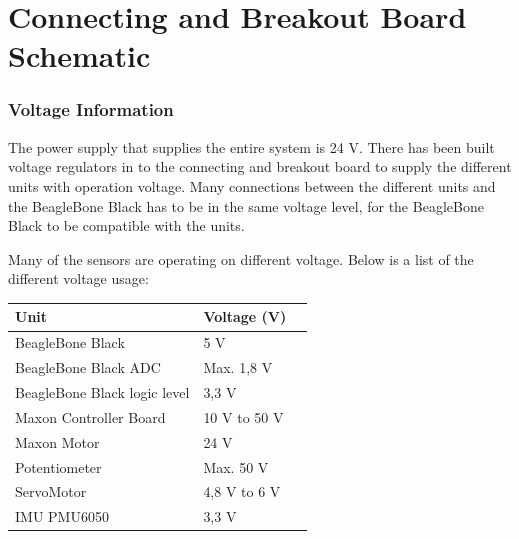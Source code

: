 \chapter{Connecting and Breakout Board Schematic}\label{app:ConnectingBreakoutBoard} 


\subsection{Voltage Information}
The power supply that supplies the entire system is 24 V. There has been built voltage regulators in to the connecting and breakout board to supply the different units with operation voltage. Many connections between the different units and the BeagleBone Black has to be in the same voltage level, for the BeagleBone Black to be compatible with the units.

Many of the sensors are operating on different voltage. Below is a list of the different voltage usage:
\begin{table}[H]
	\begin{tabular}{|l|l|p{4.3cm}|}
		\hline%
		\textbf{Unit}       &  \textbf{Voltage (V)}         \\
		\hline%
		BeagleBone Black                               & 5 V           \\
		\hline%
		BeagleBone Black ADC							  & Max. 1,8 V              \\
		\hline%
		BeagleBone Black logic level							  & 3,3 V              \\
		\hline%
		Maxon Controller Board 							  & 10 V to 50 V              \\
		\hline%
		Maxon Motor							  & 24 V             \\
		\hline%
		Potentiometer							  & Max. 50 V              \\
		\hline%
		ServoMotor							  & 4,8 V to 6 V              \\
		\hline%
		IMU PMU6050							  & 3,3 V              \\
		\hline%
	\end{tabular}
\end{table}

